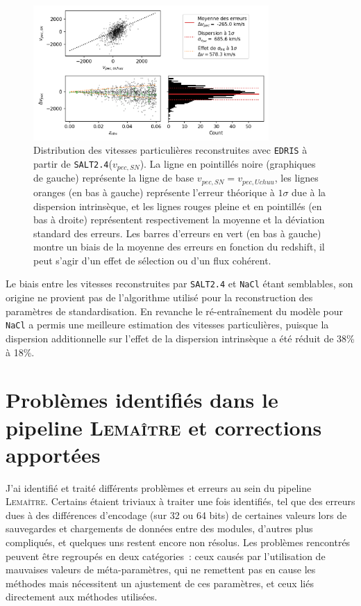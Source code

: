 \documentclass{book}
\def\lemaitre{\textsc{Lemaître}\xspace}
\def\nacl{\texttt{NaCl}\xspace}
\def\edris{\texttt{EDRIS}\xspace}
\def\saltd{\texttt{SALT2.4}\xspace}
\begin{document}
\begin{figure}
	\centering
	\includegraphics[width=0.8\textwidth]{figures/vp_nacl.png}
	\caption{Distribution des vitesses particulières reconstruites avec \edris à partir de \saltd ($v_{pec,SN}$). La ligne en pointillés noire (graphiques de gauche) représente la ligne de base $v_{pec, SN} = v_{pec, Uchuu}$, les lignes oranges (en bas à gauche) représente l'erreur théorique à $1\sigma$ due à la dispersion intrinsèque, et les lignes rouges pleine et en pointillés (en bas à droite) représentent respectivement la moyenne et la déviation standard des erreurs. Les barres d'erreurs en vert (en bas à gauche) montre un biais de la moyenne des erreurs en fonction du redshift, il peut s'agir d'un effet de sélection ou d'un flux cohérent.}
	\label{fig:vp_nacl}
\end{figure}

Le biais entre les vitesses reconstruites par \saltd et \nacl étant semblables, son origine ne provient pas de l'algorithme utilisé pour la reconstruction des paramètres de standardisation. En revanche le ré-entraînement du modèle pour \nacl a permis une meilleure estimation des vitesses particulières, puisque la dispersion additionnelle sur l'effet de la dispersion intrinsèque a été réduit de 38\% à 18\%.


\section{Problèmes identifiés dans le pipeline \lemaitre et corrections apportées}

J'ai identifié et traité différents problèmes et erreurs au sein du pipeline \lemaitre. Certains étaient triviaux à traiter une fois identifiés, tel que des erreurs dues à des différences d'encodage (sur 32 ou 64 bits) de certaines valeurs lors de sauvegardes et chargements de données entre des modules, d'autres plus compliqués, et quelques uns restent encore non résolus. Les problèmes rencontrés peuvent être regroupés en deux catégories~: ceux causés par l'utilisation de mauvaises valeurs de méta-paramètres, qui ne remettent pas en cause les méthodes mais nécessitent un ajustement de ces paramètres, et ceux liés directement aux méthodes utilisées.
\end{document}
